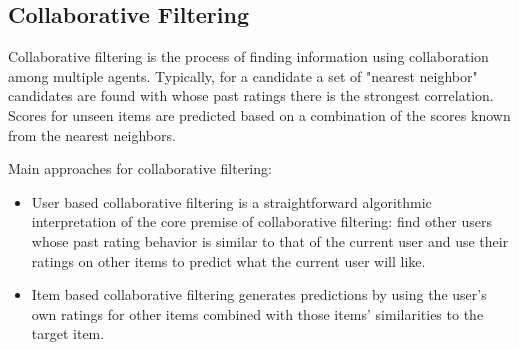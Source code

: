 \subsection{Collaborative Filtering}
 Collaborative filtering is the process of finding information using collaboration among multiple agents. Typically, for a candidate a set of "nearest neighbor" candidates are found with whose past ratings there is the strongest correlation. Scores for unseen items are predicted based on a combination of the scores known from the nearest neighbors.

Main approaches for collaborative filtering:
\begin{itemize}
\item User based collaborative filtering  is a straightforward algorithmic interpretation of the core premise of collaborative filtering: find other users whose past rating behavior is similar to that of the current user and use their ratings on other items to predict what the current user will like.
\end{itemize}
\begin{itemize}
\item Item based collaborative filtering generates predictions by using the user’s own ratings for other items combined with those items’ similarities to the target item.
\end{itemize}

